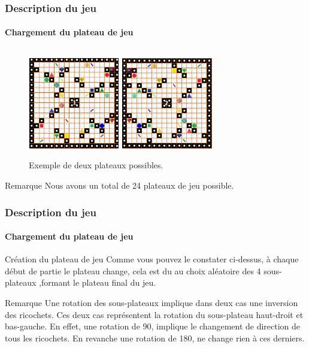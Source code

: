 \documentclass[t]{beamer}
\begin{document}
\begin{frame}
\frametitle{Description du jeu}
\framesubtitle{Chargement du plateau de jeu}
\begin{figure}
\begin{columns}[t]
\centering
\includegraphics[width=4cm,height=4cm]{plat1.png}
\centering
\includegraphics[width=4cm,height=4cm]{plat2.png}
\end{columns}
\caption{Exemple de deux plateaux possibles.}
\end{figure}
\begin{alertblock}{Remarque}
Nous avons un total de 24 plateaux de jeu possible.
\end{alertblock}
\end{frame}

\begin{frame}
\frametitle{Description du jeu}
\framesubtitle{Chargement du plateau de jeu }
\begin{block}{Création du plateau de jeu }
Comme vous pouvez le constater ci-dessus, à chaque début de partie le plateau change, cela est du au choix aléatoire des 4 sous-plateaux ,formant le plateau final du jeu.
\end{block}
\begin{alertblock}{Remarque}
Une rotation des sous-plateaux implique dans deux cas une inversion des ricochets. Ces deux cas représentent la rotation du sous-plateau haut-droit et bas-gauche.
En effet, une rotation de 90\degree, implique le changement de direction de tous les ricochets. En revanche une rotation de 180\degree, ne change rien à ces derniers.
\end{alertblock}
\end{frame}
\end{document}
